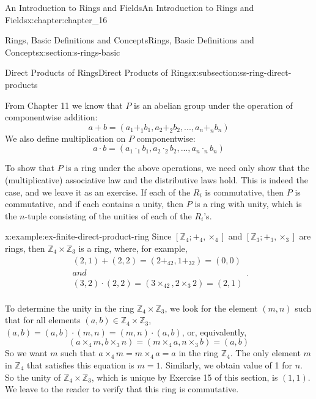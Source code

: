 \documentclass[oneside,10pt,]{book}
\numberwithin{equation}{section}
\begin{document}
\begin{chapterptx}{An Introduction to Rings and Fields}{}{An Introduction to Rings and Fields}{}{}{x:chapter:chapter_16}
\begin{sectionptx}{Rings, Basic Definitions and Concepts}{}{Rings, Basic Definitions and Concepts}{}{}{x:section:s-rings-basic}
\begin{subsectionptx}{Direct Products of Rings}{}{Direct Products of Rings}{}{}{x:subsection:ss-ring-direct-products}
\par
From Chapter 11 we know that \(P\) is an abelian group under the operation of componentwise addition:%
\begin{equation*}
a + b = \left(a_1 +_1 b_1, a_2 +_2 b_2 , . . . , a_n +_n b_n\right)
\end{equation*}
We also define multiplication on \(P\) componentwise:%
\begin{equation*}
a \cdot  b = \left(a_1 \cdot_1 b_1, a_2 \cdot _2 b_2 , . . . , a_n \cdot_n b_n\right)
\end{equation*}
%
\par
To show that \(P\) is a ring under the above operations, we need only show that the (multiplicative) associative law and the distributive laws hold. This is indeed the case, and we leave it as an exercise. If each of the \(R_i\) is commutative, then \(P\) is commutative, and if each contains a unity, then \(P\) is a ring with unity, which is the \(n\)-tuple consisting of the unities of each of the \(R_i\)'s.%
\begin{example}{}{x:example:ex-finite-direct-product-ring}%
Since \(\left[\mathbb{Z}_4;+_4,\times_4\right]\)  and \(\left[\mathbb{Z}_3;+_3,\times_3\right]\) are rings, then \(\mathbb{Z}_4 \times
\mathbb{Z}_3\) is a ring, where, for example,%
\begin{equation*}
\begin{array}{c}
(2, 1) + (2, 2) = (2 +_42, 1 +_32) = (0, 0)\\
and\\
(3, 2) \cdot (2, 2) =  (3 \times_42, 2 \times_3 2) = (2, 1)\\
\end{array}\text{.}
\end{equation*}
%
\par
To determine the unity in the ring \(\mathbb{Z}_4\times \mathbb{Z}_3\), we look for the element \((m, n)\) such that for all elements \((a, b) \in \mathbb{Z}_4\times \mathbb{Z}_3\), \((a, b) =(a, b)\cdot (m, n) = (m, n)\cdot (a, b)\), or, equivalently,%
\begin{equation*}
\left(a \times_4 m, b \times_3 n\right) = \left(m \times_4 a, n \times_3 b\right) = (a, b)
\end{equation*}
So we want \(m\) such that \(a\times_4 m = m\times_4 a=a\) in the ring \(\mathbb{Z}_4\). The only element \(m\) in \(\mathbb{Z}_4\) that satisfies this equation is \(m = 1\). Similarly, we obtain value of 1 for \(n\). So the unity of  \(\mathbb{Z}_4\times \mathbb{Z}_3\), which is unique by Exercise 15 of this section, is \((1, 1)\). We leave to the reader to verify that this ring is commutative.%

\end{example}
\end{subsectionptx}
\end{sectionptx}
\end{chapterptx}
\end{document}
